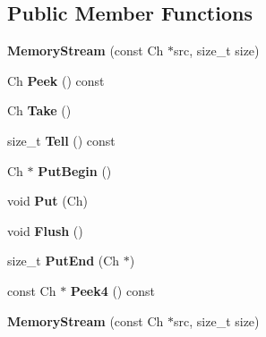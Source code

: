 \subsection*{Public Member Functions}
\begin{DoxyCompactItemize}
\item 
{\bfseries Memory\+Stream} (const Ch $\ast$src, size\+\_\+t size)\hypertarget{struct_memory_stream_a2472317ef00fcd44e5cc209e04c49756}{}\label{struct_memory_stream_a2472317ef00fcd44e5cc209e04c49756}

\item 
Ch {\bfseries Peek} () const \hypertarget{struct_memory_stream_aa6ea0b20b8687b2ee6779b879bfa846d}{}\label{struct_memory_stream_aa6ea0b20b8687b2ee6779b879bfa846d}

\item 
Ch {\bfseries Take} ()\hypertarget{struct_memory_stream_a14ff92deda5d39c9b166aaa07e82a0ee}{}\label{struct_memory_stream_a14ff92deda5d39c9b166aaa07e82a0ee}

\item 
size\+\_\+t {\bfseries Tell} () const \hypertarget{struct_memory_stream_a0b92aeeb6cc21f8f4c79b679d7034a1c}{}\label{struct_memory_stream_a0b92aeeb6cc21f8f4c79b679d7034a1c}

\item 
Ch $\ast$ {\bfseries Put\+Begin} ()\hypertarget{struct_memory_stream_a5674d10aa2faa05cb326e2e16715cc3d}{}\label{struct_memory_stream_a5674d10aa2faa05cb326e2e16715cc3d}

\item 
void {\bfseries Put} (Ch)\hypertarget{struct_memory_stream_ac445f93c23c9e85f1f5381911c4ed870}{}\label{struct_memory_stream_ac445f93c23c9e85f1f5381911c4ed870}

\item 
void {\bfseries Flush} ()\hypertarget{struct_memory_stream_a305e141314ae0e3afacb04aaf2d8bcc6}{}\label{struct_memory_stream_a305e141314ae0e3afacb04aaf2d8bcc6}

\item 
size\+\_\+t {\bfseries Put\+End} (Ch $\ast$)\hypertarget{struct_memory_stream_a74fb36c1f6f95d189502cf7a6be79135}{}\label{struct_memory_stream_a74fb36c1f6f95d189502cf7a6be79135}

\item 
const Ch $\ast$ {\bfseries Peek4} () const \hypertarget{struct_memory_stream_a49ab99772a16ead12bd56357b4801d94}{}\label{struct_memory_stream_a49ab99772a16ead12bd56357b4801d94}

\item 
{\bfseries Memory\+Stream} (const Ch $\ast$src, size\+\_\+t size)\hypertarget{struct_memory_stream_a2472317ef00fcd44e5cc209e04c49756}{}\label{struct_memory_stream_a2472317ef00fcd44e5cc209e04c49756}


\end{DoxyCompactItemize}
